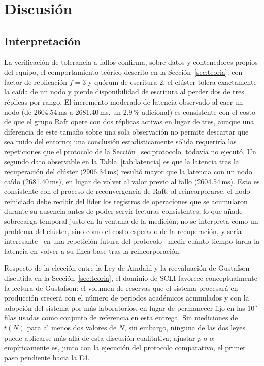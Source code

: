 \documentclass[10pt,twocolumn]{article}
\begin{document}
\section{Discusión}
\label{sec:discusion}

\subsection{Interpretación}

La verificación de tolerancia a fallos confirma, sobre datos y
contenedores propios del equipo, el comportamiento teórico descrito en la
Sección~\ref{sec:teoria}: con factor de replicación $f=3$ y quórum de
escritura $2$, el clúster tolera exactamente la caída de un nodo y pierde
disponibilidad de escritura al perder dos de tres réplicas por rango. El
incremento moderado de latencia observado al caer un nodo (de 2604.54\,ms a
2681.40\,ms, un 2.9\,\% adicional) es consistente con el costo de que el
grupo Raft opere con dos réplicas activas en lugar de tres, aunque una
diferencia de este tamaño sobre una sola observación no permite descartar
que sea ruido del entorno; una conclusión estadísticamente sólida requeriría
las repeticiones que el protocolo de la Sección~\ref{sec:protocolo}
todavía no ejecutó. Un segundo dato observable en la Tabla~\ref{tab:latencia}
es que la latencia tras la recuperación del clúster (2906.34\,ms) resultó
mayor que la latencia con un nodo caído (2681.40\,ms), en lugar de volver
al valor previo al fallo (2604.54\,ms). Esto es consistente con el proceso
de reconvergencia de Raft: al reincorporarse, el nodo reiniciado debe
recibir del líder los registros de operaciones que se acumularon durante su
ausencia antes de poder servir lecturas consistentes, lo que añade
sobrecarga temporal justo en la ventana de la medición; no se interpreta
como un problema del clúster, sino como el costo esperado de la
recuperación, y sería interesante --en una repetición futura del
protocolo-- medir cuánto tiempo tarda la latencia en volver a su línea
base tras la reincorporación.

Respecto de la elección entre la Ley de Amdahl y la reevaluación de
Gustafson discutida en la Sección~\ref{sec:teoria}, el dominio de SCLI
favorece conceptualmente la lectura de Gustafson: el volumen de reservas
que el sistema procesará en producción crecerá con el número de periodos
académicos acumulados y con la adopción del sistema por más laboratorios,
en lugar de permanecer fijo en las $10^5$ filas usadas como conjunto de
referencia en esta entrega. Sin mediciones de $t(N)$ para al menos dos
valores de $N$, sin embargo, ninguna de las dos leyes puede aplicarse más
allá de esta discusión cualitativa; ajustar $p$ o $\alpha$ empíricamente
es, junto con la ejecución del protocolo comparativo, el primer paso
pendiente hacia la E4.
\end{document}
